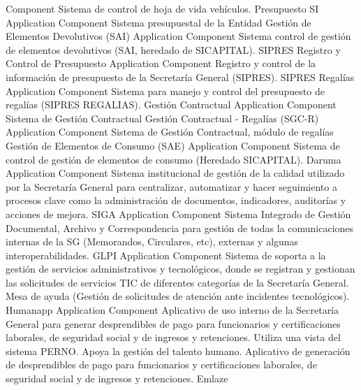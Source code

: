 \documentclass[
	a4paper, %
	12pt, %
]{include/CSSullivanBusinessReport}
\begin{document}
Component \textbar{} Sistema de control de hoja de vida vehículos.
\textbar{} \textbar{} Presupuesto SI \textbar{} Application Component
\textbar{} Sistema presupuestal de la Entidad \textbar{} \textbar{}
Gestión de Elementos Devolutivos (SAI) \textbar{} Application Component
\textbar{} Sistema control de gestión de elementos devolutivos (SAI,
heredado de SICAPITAL). \textbar{} \textbar{} SIPRES Registro y Control
de Presupuesto \textbar{} Application Component \textbar{} Registro y
control de la información de presupuesto de la Secretaría General
(SIPRES). \textbar{} \textbar{} SIPRES Regalías \textbar{} Application
Component \textbar{} Sistema para manejo y control del presupuesto de
regalías (SIPRES REGALIAS). \textbar{} \textbar{} Gestión Contractual
\textbar{} Application Component \textbar{} Sistema de Gestión
Contractual \textbar{} \textbar{} Gestión Contractual - Regalías (SGC-R)
\textbar{} Application Component \textbar{} Sistema de Gestión
Contractual, módulo de regalías \textbar{} \textbar{} Gestión de
Elementos de Consumo (SAE) \textbar{} Application Component \textbar{}
Sistema de control de gestión de elementos de consumo (Heredado
SICAPITAL). \textbar{} \textbar{} Daruma \textbar{} Application
Component \textbar{} Sistema institucional de gestión de la calidad
utilizado por la Secretaría General para centralizar, automatizar y
hacer seguimiento a procesos clave como la administración de documentos,
indicadores, auditorías y acciones de mejora. \textbar{} \textbar{} SIGA
\textbar{} Application Component \textbar{} Sistema Integrado de Gestión
Documental, Archivo y Correspondencia para gestión de todas la
comunicaciones internas de la SG (Memorandos, Circulares, etc), externas
y algunas interoperabilidades. \textbar{} \textbar{} GLPI \textbar{}
Application Component \textbar{} Sistema de soporta a la gestión de
servicios administrativos y tecnológicos, donde se registran y gestionan
las solicitudes de servicios TIC de diferentes categorías de la
Secretaría General. Mesa de ayuda (Gestión de solicitudes de atención
ante incidentes tecnológicos). \textbar{} \textbar{} Humanapp \textbar{}
Application Component \textbar{} Aplicativo de uso interno de la
Secretaría General para generar desprendibles de pago para funcionarios
y certificaciones laborales, de seguridad social y de ingresos y
retenciones. Utiliza una vista del sistema PERNO. Apoya la gestión del
talento humano. Aplicativo de generación de desprendibles de pago para
funcionarios y certificaciones laborales, de seguridad social y de
ingresos y retenciones. \textbar{} \textbar{} Emlaze \textbar{}
\end{document}
